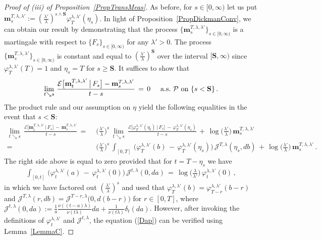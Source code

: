 \documentclass[10pt]{article}
\numberwithin{equation}{section}
\theoremstyle{definition}
\begin{document}
\begin{proof}[Proof of (iii) of Proposition~\ref{PropTransMeas}] As before,  for $s\in [0,\infty)$ let us put $\mathbf{m}_s^{T,\lambda,\lambda'}:=(\frac{\lambda'}{\lambda})^{s\wedge \mathbf{S}}\varphi_T^{\lambda,\lambda'}( \eta_s  ) $.  In light of Proposition~\ref{PropDickmanConv}, we can obtain our result by demonstrating that the  process $\{ \mathbf{m}_s^{T,\lambda,\lambda'}\}_{s\in [0,\infty)  }$ is a martingale with respect to  $\{  F_s\}_{s\in [0,\infty)}$  for any $\lambda' >0$.  The process $\{ \mathbf{m}_s^{T,\lambda,\lambda'}\}_{s\in [0,\infty)}$ is constant and equal to $(\frac{\lambda'}{\lambda})^{ \mathbf{S}}$ over the interval $[\mathbf{S},\infty)$ since  $\varphi_T^{\lambda,\lambda'}( T )=1$ and $\eta_s=T$ for $s\geq \mathbf{S}$.  It suffices to show that 
$$ \lim_{t\searrow s}\, \frac{\mathcal{E}\big[\mathbf{m}_t^{T,\lambda,\lambda'}\,\big|\, F_s  \big]-\mathbf{m}_s^{T,\lambda,\lambda'} }{t-s}\,=\,0  \hspace{.5cm}\text{a.s.\  $\mathcal{P}$ on  $\{s<\mathbf{S}\}$} \,. $$
  The product rule and our assumption on $\eta$ yield the following equalities in the event that $s<\mathbf{S}$:
\begin{align*}
  \lim_{t\searrow s}\,  \frac{\mathcal{E}\big[ \mathbf{m}_t^{T,\lambda,\lambda'}\,\big|\, F_s \big]\,-\,\mathbf{m}_s^{T,\lambda,\lambda'} }{t-s}   \,=\, &\,  \Big(\frac{\lambda'}{\lambda}\Big)^s \,\lim_{t\searrow s} \, \frac{\mathcal{E}\big[\varphi_T^{\lambda,\lambda'}( \eta_t )\,\big|\, F_s  \big]\,-\,\varphi_T^{\lambda,\lambda'}( \eta_s ) }{t-s}\,+\,\log\Big(\frac{\lambda'}{\lambda}\Big)\,\mathbf{m}_s^{T,\lambda,\lambda'} \nonumber \\  =\,&\, \Big(\frac{\lambda'}{\lambda}\Big)^s\,
\int_{[0,T]}\,\Big( \varphi_T^{\lambda,\lambda'}(b )\,-\,\varphi_T^{\lambda,\lambda'}( \eta_s ) \Big)  \, \mathscr{J}^{T, \lambda}(\eta_s,db) \,+\,\log\Big(\frac{\lambda'}{\lambda}\Big)\,\mathbf{m}_s^{T,\lambda,\lambda'} \,.
\end{align*}
  The right side above is equal to zero provided that for $t=T-\eta_s$ we have
\begin{align}\label{Dap}
\int_{[0,t]}\,\Big( \varphi_t^{\lambda,\lambda'}(a) \,-\,\varphi_t^{\lambda,\lambda'}(0)      \Big) \, \mathscr{J}^{t,\lambda}(0,da)\,=\,\log\Big(\frac{\lambda}{\lambda'}\Big) \,\varphi_t^{\lambda,\lambda'}(0) \,,
\end{align}
in which we have factored out $ (\frac{\lambda'}{\lambda})^s$ and used that $  \varphi_T^{\lambda,\lambda'}(b )=\varphi_{T-r}^{\lambda,\lambda'}(b-r)  $ and $\mathscr{J}^{T, \lambda}(r,db)= \mathscr{J}^{T-r,\lambda}\big(0,d(b-r)\big) $ for $r\in [0,T]$, where  $\mathscr{J}^{t,\lambda}(0,da):=\frac{1}{a} \frac{ \nu((t-a)\lambda)   }{ \nu(t\lambda)  }da+\frac{ 1  }{ \nu(t\lambda)  }\delta_t(da)$. However, after invoking the definitions of $\varphi_t^{\lambda,\lambda'}$ and $\mathscr{J}^{t,\lambda} $, the equation (\ref{Dap}) can be verified using Lemma~\ref{LemmaC}.
\end{proof}
\end{document}
